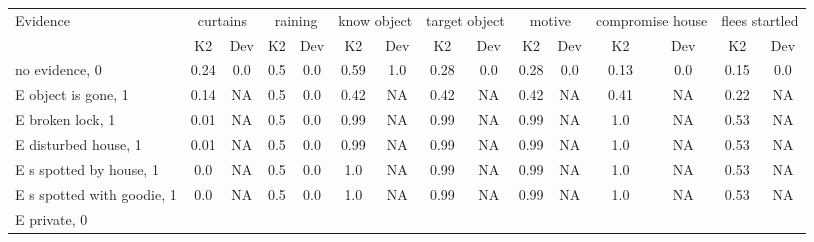 \begin{table}\begin{tabular}{l|cc|cc|cc|cc|cc|cc|cc}\toprule\multirow{2}{*}{Evidence} & \multicolumn{2}{c}{curtains}& \multicolumn{2}{c}{raining}& \multicolumn{2}{c}{know object}& \multicolumn{2}{c}{target object}& \multicolumn{2}{c}{motive}& \multicolumn{2}{c}{compromise house}& \multicolumn{2}{c}{flees startled}\\& {K2} & {Dev}& {K2} & {Dev}& {K2} & {Dev}& {K2} & {Dev}& {K2} & {Dev}& {K2} & {Dev}& {K2} & {Dev}\\\midrule
no evidence, 0 & \cellcolor{Bittersweet}0.24&\cellcolor{Bittersweet}0.0&\cellcolor{Bittersweet}0.5&\cellcolor{Bittersweet}0.0&\cellcolor{Bittersweet}0.59&\cellcolor{Bittersweet}1.0&\cellcolor{Bittersweet}0.28&\cellcolor{Bittersweet}0.0&\cellcolor{Bittersweet}0.28&\cellcolor{Bittersweet}0.0&\cellcolor{Bittersweet}0.13&\cellcolor{Bittersweet}0.0&\cellcolor{Bittersweet}0.15&\cellcolor{Bittersweet}0.0\\E object is gone, 1 & \cellcolor{Bittersweet}0.14&\cellcolor{Bittersweet}NA&\cellcolor{Bittersweet}0.5&\cellcolor{Bittersweet}0.0&\cellcolor{Bittersweet}0.42&\cellcolor{Bittersweet}NA&\cellcolor{Bittersweet}0.42&\cellcolor{Bittersweet}NA&\cellcolor{Bittersweet}0.42&\cellcolor{Bittersweet}NA&\cellcolor{Bittersweet}0.41&\cellcolor{Bittersweet}NA&\cellcolor{Bittersweet}0.22&\cellcolor{Bittersweet}NA\\E broken lock, 1 & \cellcolor{Bittersweet}0.01&\cellcolor{Bittersweet}NA&\cellcolor{Bittersweet}0.5&\cellcolor{Bittersweet}0.0&\cellcolor{Bittersweet}0.99&\cellcolor{Bittersweet}NA&\cellcolor{Bittersweet}0.99&\cellcolor{Bittersweet}NA&\cellcolor{Bittersweet}0.99&\cellcolor{Bittersweet}NA&\cellcolor{Bittersweet}1.0&\cellcolor{Bittersweet}NA&\cellcolor{Bittersweet}0.53&\cellcolor{Bittersweet}NA\\E disturbed house, 1 & \cellcolor{Bittersweet}0.01&\cellcolor{Bittersweet}NA&\cellcolor{Bittersweet}0.5&\cellcolor{Bittersweet}0.0&\cellcolor{Bittersweet}0.99&\cellcolor{Bittersweet}NA&\cellcolor{Bittersweet}0.99&\cellcolor{Bittersweet}NA&\cellcolor{Bittersweet}0.99&\cellcolor{Bittersweet}NA&\cellcolor{Bittersweet}1.0&\cellcolor{Bittersweet}NA&\cellcolor{Bittersweet}0.53&\cellcolor{Bittersweet}NA\\E s spotted by house, 1 & \cellcolor{Bittersweet}0.0&\cellcolor{Bittersweet}NA&\cellcolor{Bittersweet}0.5&\cellcolor{Bittersweet}0.0&\cellcolor{Bittersweet}1.0&\cellcolor{Bittersweet}NA&\cellcolor{Bittersweet}0.99&\cellcolor{Bittersweet}NA&\cellcolor{Bittersweet}0.99&\cellcolor{Bittersweet}NA&\cellcolor{Bittersweet}1.0&\cellcolor{Bittersweet}NA&\cellcolor{Bittersweet}0.53&\cellcolor{Bittersweet}NA\\E s spotted with goodie, 1 & \cellcolor{Bittersweet}0.0&\cellcolor{Bittersweet}NA&\cellcolor{Bittersweet}0.5&\cellcolor{Bittersweet}0.0&\cellcolor{Bittersweet}1.0&\cellcolor{Bittersweet}NA&\cellcolor{Bittersweet}0.99&\cellcolor{Bittersweet}NA&\cellcolor{Bittersweet}0.99&\cellcolor{Bittersweet}NA&\cellcolor{Bittersweet}1.0&\cellcolor{Bittersweet}NA&\cellcolor{Bittersweet}0.53&\cellcolor{Bittersweet}NA\\E private, 0 & 
\end{tabular}
\end{table}
